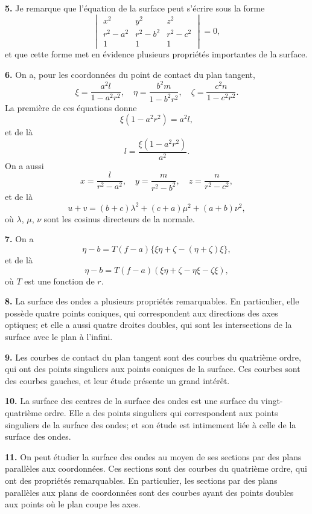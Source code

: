 \documentclass[12pt,a4paper]{article}
\begin{document}
\textbf{5.} Je remarque que l'\'equation de la surface peut s'\'ecrire sous la forme
\[
\begin{vmatrix}
x^2 & y^2 & z^2 \\
r^2-a^2 & r^2-b^2 & r^2-c^2 \\
1 & 1 & 1
\end{vmatrix} = 0,
\]
et que cette forme met en \'evidence plusieurs propri\'et\'es importantes de la surface.

\textbf{6.} On a, pour les coordonn\'ees du point de contact du plan tangent,
\[
\xi = \frac{a^2l}{1-a^2r^2}, \quad \eta = \frac{b^2m}{1-b^2r^2}, \quad \zeta = \frac{c^2n}{1-c^2r^2}.
\]
La premi\`ere de ces \'equations donne
\[
\xi(1-a^2r^2) = a^2l,
\]
et de l\`a
\[
l = \frac{\xi(1-a^2r^2)}{a^2}.
\]
On a aussi
\[
x = \frac{l}{r^2-a^2}, \quad y = \frac{m}{r^2-b^2}, \quad z = \frac{n}{r^2-c^2},
\]
et de l\`a
\[
u + v = (b+c)\lambda^2 + (c+a)\mu^2 + (a+b)\nu^2,
\]
o\`u $\lambda$, $\mu$, $\nu$ sont les cosinus directeurs de la normale.

\newpage
\textbf{7.} On a
\[
\eta - b = T(f-a)\{\xi\eta + \zeta - (\eta + \zeta)\xi\},
\]
et de l\`a
\[
\eta - b = T(f-a)(\xi\eta + \zeta - \eta\xi - \zeta\xi),
\]
o\`u $T$ est une fonction de $r$.

\textbf{8.} La surface des ondes a plusieurs propri\'et\'es remarquables. En
particulier, elle poss\`ede quatre points coniques, qui correspondent aux directions
des axes optiques; et elle a aussi quatre droites doubles, qui sont les intersections
de la surface avec le plan \`a l'infini.

\textbf{9.} Les courbes de contact du plan tangent sont des courbes du quatri\`eme
ordre, qui ont des points singuliers aux points coniques de la surface. Ces courbes
sont des courbes gauches, et leur \'etude pr\'esente un grand int\'er\^et.

\textbf{10.} La surface des centres de la surface des ondes est une surface du
vingt-quatri\`eme ordre. Elle a des points singuliers qui correspondent aux points
singuliers de la surface des ondes; et son \'etude est intimement li\'ee \`a celle de la
surface des ondes.

\textbf{11.} On peut \'etudier la surface des ondes au moyen de ses sections par
des plans parall\`eles aux coordonn\'ees. Ces sections sont des courbes du quatri\`eme
ordre, qui ont des propri\'et\'es remarquables. En particulier, les sections par des
plans parall\`eles aux plans de coordonn\'ees sont des courbes ayant des points doubles
aux points o\`u le plan coupe les axes.
\end{document}
